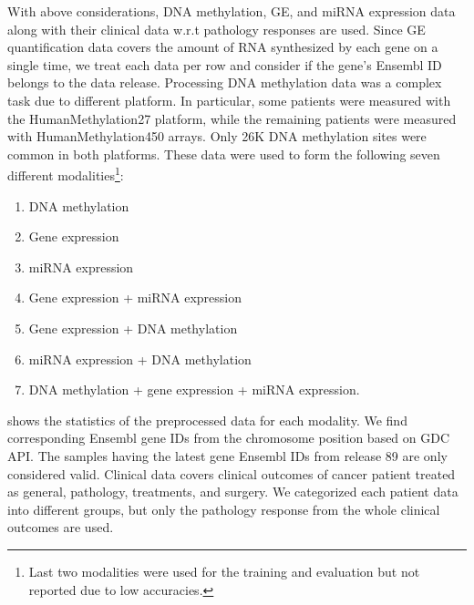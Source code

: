 \hspace*{3.5mm} With above considerations, DNA methylation, GE, and miRNA expression data along with their clinical data w.r.t pathology responses are used. 
Since GE quantification data covers the amount of RNA synthesized by each gene on a single time, we treat each data per row and consider if the gene's Ensembl ID belongs to the data release. 
Processing DNA methylation data was a complex task due to different platform. In particular, some patients were measured with the HumanMethylation27 platform, while the remaining patients were measured with HumanMethylation450 arrays. Only 26K DNA methylation sites were common in both platforms. These data were used to form the following seven different modalities\footnote{Last two modalities were used for the training and evaluation but not reported due to low accuracies.}: 

\begin{enumerate}[noitemsep]
    \item DNA methylation 
    \item Gene expression 
    \item miRNA expression 
    \item Gene expression + miRNA expression 
    \item Gene expression + DNA methylation 
    \item miRNA expression + DNA methylation  
    \item DNA methylation + gene expression + miRNA expression. 
\end{enumerate}

\hspace*{3.5mm}  shows the statistics of the preprocessed data for each modality. We find corresponding Ensembl gene IDs from the chromosome position based on GDC API. The samples having the latest gene Ensembl IDs from release 89 are only considered valid. Clinical data covers clinical outcomes of cancer patient treated as general, pathology, treatments, and surgery. We categorized each patient data into different groups, but only the pathology response 
from the whole clinical outcomes are used. 

